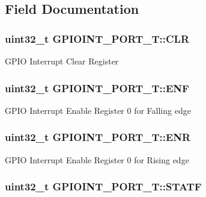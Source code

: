 \subsection{Field Documentation}
\hypertarget{structGPIOINT__PORT__T_aca139ec8cd0a157793ab02b63caaa32b}{
\subsubsection[{C\-L\-R}]{ uint32\-\_\-t G\-P\-I\-O\-I\-N\-T\-\_\-\-P\-O\-R\-T\-\_\-\-T\-::\-C\-L\-R}}\label{structGPIOINT__PORT__T_aca139ec8cd0a157793ab02b63caaa32b}
G\-P\-I\-O Interrupt Clear Register \hypertarget{structGPIOINT__PORT__T_ac0330b9c737da49042c1318175e13038}{
\subsubsection[{E\-N\-F}]{ uint32\-\_\-t G\-P\-I\-O\-I\-N\-T\-\_\-\-P\-O\-R\-T\-\_\-\-T\-::\-E\-N\-F}}\label{structGPIOINT__PORT__T_ac0330b9c737da49042c1318175e13038}
G\-P\-I\-O Interrupt Enable Register 0 for Falling edge \hypertarget{structGPIOINT__PORT__T_aec2ea22900c6c655ffe5da100027c792}{
\subsubsection[{E\-N\-R}]{ uint32\-\_\-t G\-P\-I\-O\-I\-N\-T\-\_\-\-P\-O\-R\-T\-\_\-\-T\-::\-E\-N\-R}}\label{structGPIOINT__PORT__T_aec2ea22900c6c655ffe5da100027c792}
G\-P\-I\-O Interrupt Enable Register 0 for Rising edge \hypertarget{structGPIOINT__PORT__T_a4439b8e7ddaac1768c0caf158a884375}{
\subsubsection[{S\-T\-A\-T\-F}]{ uint32\-\_\-t G\-P\-I\-O\-I\-N\-T\-\_\-\-P\-O\-R\-T\-\_\-\-T\-::\-S\-T\-A\-T\-F}}\label{structGPIOINT__PORT__T_a4439b8e7ddaac1768c0caf158a884375}
